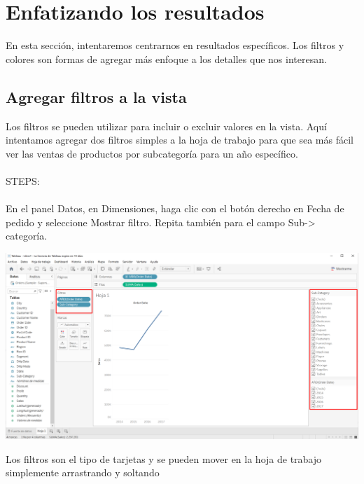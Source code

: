 \documentclass[12pt,letterpaper]{article}
\begin{document}
\section{Enfatizando los resultados} 
En esta sección, intentaremos centrarnos en resultados específicos. Los filtros y colores son formas de
agregar más enfoque a los detalles que nos interesan.
\subsection{Agregar filtros a la vista}
Los filtros se pueden utilizar para incluir o excluir valores en la vista. Aquí intentamos agregar dos
filtros simples a la hoja de trabajo para que sea más fácil ver las ventas de productos por subcategoría
para un año específico.
\\\\STEPS:
\\\\En el panel Datos, en Dimensiones, haga clic con el botón derecho en Fecha de pedido y seleccione
Mostrar filtro. Repita también para el campo Sub-> categoría.
\begin{center}
    \includegraphics[width=16cm]{img/12.png}  
\end{center}
Los filtros son el tipo de tarjetas y se pueden mover en la hoja de trabajo simplemente
arrastrando y soltando
\end{document}
